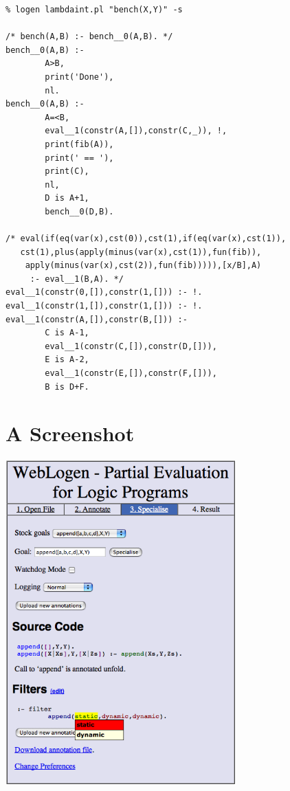 \documentclass{sig-alternate}
\begin{document}
 \begin{footnotesize}
\begin{verbatim}
% logen lambdaint.pl "bench(X,Y)" -s

/* bench(A,B) :- bench__0(A,B). */
bench__0(A,B) :-
        A>B,
        print('Done'),
        nl.
bench__0(A,B) :-
        A=<B,
        eval__1(constr(A,[]),constr(C,_)), !,
        print(fib(A)),
        print(' == '),
        print(C),
        nl,
        D is A+1,
        bench__0(D,B).

/* eval(if(eq(var(x),cst(0)),cst(1),if(eq(var(x),cst(1)),
   cst(1),plus(apply(minus(var(x),cst(1)),fun(fib)),
    apply(minus(var(x),cst(2)),fun(fib))))),[x/B],A)
     :- eval__1(B,A). */
eval__1(constr(0,[]),constr(1,[])) :- !.
eval__1(constr(1,[]),constr(1,[])) :- !.
eval__1(constr(A,[]),constr(B,[])) :-
        C is A-1,
        eval__1(constr(C,[]),constr(D,[])),
        E is A-2,
        eval__1(constr(E,[]),constr(F,[])),
        B is D+F.
\end{verbatim}
  \end{footnotesize}
  
  
\section{A Screenshot}


\begin{center}
\includegraphics[width=3.5in]{Weblogen_screen}
\end{center}
\end{document}
